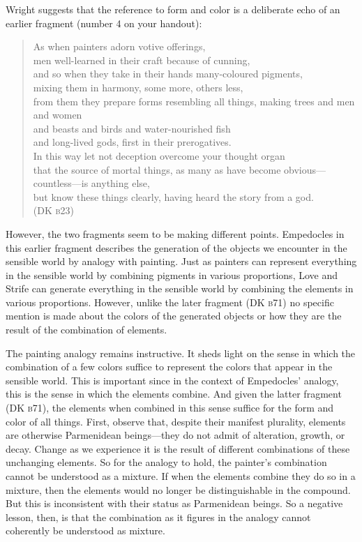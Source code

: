 Wright suggests that the reference to form and color is a deliberate echo of an earlier fragment (number 4 on your handout):
\begin{verse}
    As when painters adorn votive offerings,\\
    men well-learned in their craft because of cunning,\\
    and so when they take in their hands many-coloured pigments,\\
    mixing them in harmony, some more, others less,\\
    from them they prepare forms resembling all things,
    making trees and men and women\\
    and beasts and birds and water-nourished fish\\
    and long-lived gods, first in their prerogatives.\\
    In this way let not deception overcome your thought organ\\
    that the source of mortal things, as many as have become obvious---countless---is anything else,\\
    but know these things clearly, having heard the story from a god.\\ 
    (DK \textsc{b}23)
\end{verse}
However, the two fragments seem to be making different points. Empedocles in this earlier fragment describes the generation of the objects we encounter in the sensible world by analogy with painting. Just as painters can represent everything in the sensible world by combining pigments in various proportions, Love and Strife can generate everything in the sensible world by combining the elements in various proportions. However, unlike the later fragment (DK \textsc{b}71) no specific mention is made about the colors of the generated objects or how they are the result of the combination of elements.

The painting analogy remains instructive. It sheds light on the sense in which the combination of a few colors suffice to represent the colors that appear in the sensible world. This is important since in the context of Empedocles' analogy, this is the sense in which the elements combine. And given the latter fragment (DK \textsc{b}71), the elements when combined in this sense suffice for the form and color of all things. First, observe that, despite their manifest plurality, elements are otherwise Parmenidean beings---they do not admit of alteration, growth, or decay. Change as we experience it is the result of different combinations of these unchanging elements. So for the analogy to hold, the painter's combination cannot be understood as a mixture. If when the elements combine they do so in a mixture, then the elements would no longer be distinguishable in the compound. But this is inconsistent with their status as Parmenidean beings. So a negative lesson, then, is that the combination as it figures in the analogy cannot coherently be understood as mixture.

